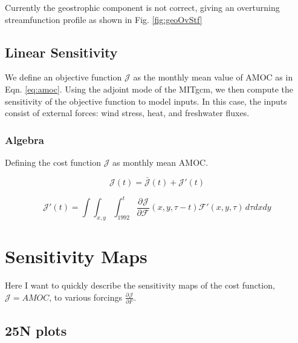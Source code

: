 \documentclass[a4paper,11pt]{article}
\newcommand{\pderiv}[3][]{%
  \ensuremath{\frac{\partial^{#1} {#2}}{\partial {#3}^{#1}}}}
\begin{document}
    Currently the geostrophic component is not correct, giving an overturning streamfunction profile as shown in Fig. \ref{fig:geoOvStf}
    

   
  \subsection{Linear Sensitivity}
  \label{linearSensitivity}
  
  We define an objective function $\mathcal{J}$ as the monthly mean value of AMOC as in Eqn. \ref{eq:amoc}. Using the adjoint mode of the MITgcm, we then compute the sensitivity of the objective function to model inputs. In this case, the inputs consist of external forces: wind stress, heat, and freshwater fluxes. 
  

	\subsubsection{Algebra}
	
	Defining the cost function $\mathcal{J}$ as monthly mean AMOC. 

	\begin{equation}
	  \mathcal{J}(t) = \bar{\mathcal{J}}(t) + \mathcal{J}'(t)
	\end{equation}

	\begin{equation}
	  \mathcal{J}'(t) = \int\int_{x,y}\int_{1992}^{t}\pderiv{\mathcal{J}}{\mathcal{F}}(x,y,\tau-t)\mathcal{F}'(x,y,\tau)\,d\tau dxdy
	\end{equation}


 \section{Sensitivity Maps}

  Here I want to quickly describe the sensitivity maps of the cost function, $\mathcal{J} = AMOC$, to various forcings $\pderiv{\mathcal{J}}{F}$. 

    \subsection{25N plots}
\end{document}
